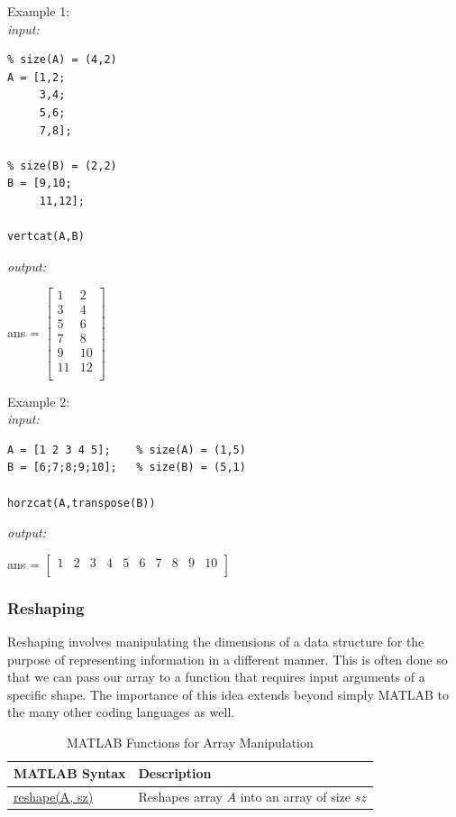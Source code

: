 \documentclass[../MATLAB_Primer.tex]{subfiles}
\begin{document}
Example 1: \\

\textit{input:}
\begin{lstlisting}
% size(A) = (4,2)
A = [1,2;
     3,4;
     5,6;
     7,8];  

% size(B) = (2,2)
B = [9,10;
     11,12];       

vertcat(A,B)
\end{lstlisting}
\textit{output:}
\begin{center}
    ans = $\begin{bmatrix}
     1 & 2\\
     3 & 4\\
     5 & 6\\
     7 & 8\\
     9 & 10\\
     11 & 12\\
    \end{bmatrix}$
\end{center}

Example 2:\\

\textit{input:}
\begin{lstlisting}
A = [1 2 3 4 5];    % size(A) = (1,5)
B = [6;7;8;9;10];   % size(B) = (5,1)

horzcat(A,transpose(B))
\end{lstlisting}
\textit{output:}
\begin{center}
    ans = $\begin{bmatrix}
     1 & 2 & 3 & 4 & 5 & 6 & 7 & 8 & 9 & 10\\
    \end{bmatrix}$
\end{center}

\subsubsection{Reshaping}
Reshaping involves manipulating the dimensions of a data structure for the purpose of representing information in a different manner.  This is often done so that we can pass our array to a function that requires input arguments of a specific shape. The importance of this idea extends beyond simply MATLAB to the many other coding languages as well. 

\begin{table}[H]
\caption{MATLAB Functions for Array Manipulation}
    \begin{center}
        \begin{tabular}{| C{3cm} | m{12cm}|}
            \hline
            \textbf{MATLAB Syntax} & \textbf{Description}\\
            
            \hline
            \href{https://www.mathworks.com/help/matlab/ref/reshape.html}{\color{blue}reshape(A, sz)} & Reshapes array $A$ into an array of size $sz$\\
            \hline
            
        \end{tabular}
        \label{tab:array_manipulation}
    \end{center}
\end{table}
\end{document}

